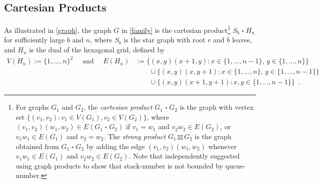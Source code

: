 \documentclass[kpfonts]{patmorin}
\newcommand{\CartProd}{\mathbin{\square}}
\begin{document}
\subsection*{Cartesian Products}

As illustrated in \cref{graph}, the graph $G$ in \cref{family} is the cartesian product\footnote{For graphs $G_1$ and $G_2$, the \emph{cartesian product} $G_1\CartProd G_2$ is the graph with vertex set $\{(v_1,v_2): v_1 \in V(G_1), v_2 \in V(G_2)\}$, where $(v_1,v_2)(w_1,w_2)\in E(G_1\CartProd G_2)$ if $v_1=w_1$ and $v_2w_2\in E(G_2)$, or $v_1w_1\in E(G_1)$ and $v_2=w_2$. The \emph{strong product} $G_1\boxtimes G_2$ is the graph obtained from $G_1\CartProd G_2$ by adding the edge $(v_1,v_2)(w_1,w_2)$ whenever $v_1w_1\in E(G_1)$ and $v_2w_2\in E(G_2)$. Note that \citet{Pupyrev20} independently suggested using graph products to show that stack-number is not bounded by queue-number.} $S_b\CartProd H_n$ for sufficiently large $b$ and $n$, where $S_b$ is the star graph with root $r$ and $b$ leaves, and $H_n$ is the dual of the hexagonal grid, defined by
\begin{align*}
V(H_n)  :=\{1,\ldots,n\}^2 \quad \text{ and } \quad
E(H_n) & :=  \{(x,y)(x+1,y):x\in\{1,\ldots,n-1\},\,y\in\{1,\ldots,n\}\} \\
& \qquad \cup \{(x,y)(x,y+1):x\in\{1,\ldots,n\},\,y\in\{1,\ldots,n-1\}\} \\
& \qquad \cup \{(x,y)(x+1,y+1):x,y\in\{1,\ldots,n-1\}\} \enspace .
\end{align*}
\end{document}
